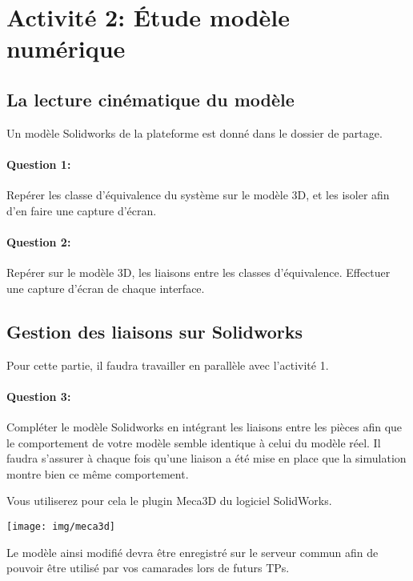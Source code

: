 \section{Activité 2: Étude modèle numérique}

\subsection{La lecture cinématique du modèle}

Un modèle Solidworks de la plateforme est donné dans le dossier de partage.

\paragraph{Question 1:} Repérer les classe d'équivalence du système sur le modèle 3D, et les isoler afin d'en faire une capture d'écran.

\paragraph{Question 2:} Repérer sur le modèle 3D, les liaisons entre les classes d'équivalence. Effectuer une capture d'écran de chaque interface.

\subsection{Gestion des liaisons sur Solidworks}

Pour cette partie, il faudra travailler en parallèle avec l'activité 1.

\paragraph{Question 3:} Compléter le modèle Solidworks en intégrant les liaisons entre les pièces afin que le comportement de votre modèle semble identique à celui du modèle réel. Il faudra s'assurer à chaque fois qu'une liaison a été mise en place que la simulation montre bien ce même comportement.

\begin{minipage}{0.45\linewidth}
Vous utiliserez pour cela le plugin Meca3D du logiciel SolidWorks.
\end{minipage}
\hfill
\begin{minipage}{0.5\linewidth}
\texttt{[image: img/meca3d]}
\end{minipage}

Le modèle ainsi modifié devra être enregistré sur le serveur commun afin de pouvoir être utilisé par vos camarades lors de futurs TPs.

